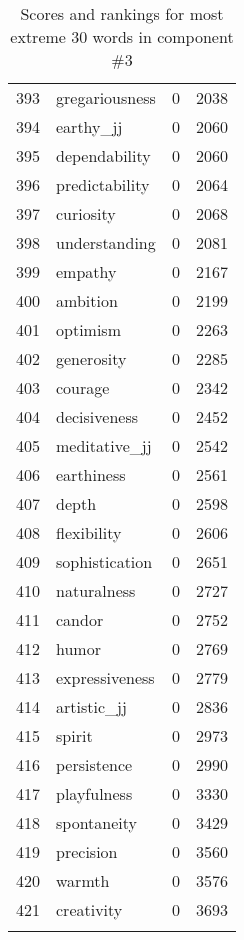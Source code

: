 \begin{longtable}[!htbp]{| rlr@{.}l |}
    393 & gregariousness & 0 & 2038 \\
    394 & earthy\_jj & 0 & 2060 \\
    395 & dependability & 0 & 2060 \\
    396 & predictability & 0 & 2064 \\
    397 & curiosity & 0 & 2068 \\
    398 & understanding & 0 & 2081 \\
    399 & empathy & 0 & 2167 \\
    400 & ambition & 0 & 2199 \\
    401 & optimism & 0 & 2263 \\
    402 & generosity & 0 & 2285 \\
    403 & courage & 0 & 2342 \\
    404 & decisiveness & 0 & 2452 \\
    405 & meditative\_jj & 0 & 2542 \\
    406 & earthiness & 0 & 2561 \\
    407 & depth & 0 & 2598 \\
    408 & flexibility & 0 & 2606 \\
    409 & sophistication & 0 & 2651 \\
    410 & naturalness & 0 & 2727 \\
    411 & candor & 0 & 2752 \\
    412 & humor & 0 & 2769 \\
    413 & expressiveness & 0 & 2779 \\
    414 & artistic\_jj & 0 & 2836 \\
    415 & spirit & 0 & 2973 \\
    416 & persistence & 0 & 2990 \\
    417 & playfulness & 0 & 3330 \\
    418 & spontaneity & 0 & 3429 \\
    419 & precision & 0 & 3560 \\
    420 & warmth & 0 & 3576 \\
    421 & creativity & 0 & 3693 \\
    \hline
    \caption{Scores and rankings for most extreme 30 words in component \#3} \\
\end{longtable}
